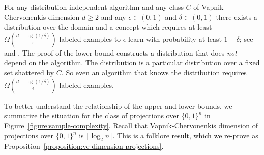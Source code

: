 \documentclass[10pt]{article}
\begin{document}
For any distribution-independent algorithm and any class $C$ of
Vapnik-Chervonenkis dimension $d \ge 2$ and any $\epsilon \in (0,1)$ and $\delta
\in (0,1)$ there exists a distribution over the domain and a concept which
requires at least $\Omega \left(\frac{d + \log(1/\delta)}{\epsilon}\right)$
labeled examples to $\epsilon$-learn with probability at least $1 - \delta$;
see~\cite[Theorem 5.3]{Anthony-Bartlett-1999} and
\cite{Blumer-Ehrenfeucht-Haussler-Warmuth-1989,
Ehrenfeucht-Haussler-Kearns-Valiant-1989}. The proof of the lower bound
constructs a distribution that does \emph{not} depend on the algorithm. The
distribution is a particular distribution over a fixed set shattered by $C$. So
even an algorithm that knows the distribution requires $\Omega \left(\frac{d +
\log(1/\delta)}{\epsilon}\right)$ labeled examples.

To better understand the relationship of the upper and lower bounds, we
summarize the situation for the class of projections over $\{0,1\}^n$ in
Figure~\ref{figure:sample-complexity}. Recall that Vapnik-Chervonenkis dimension
of projections over $\{0,1\}^n$ is $\lfloor \log_2 n \rfloor$. This is a
folklore result, which we re-prove as
Proposition~\ref{proposition:vc-dimension-projections}.
\end{document}
